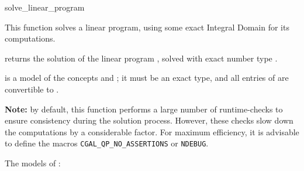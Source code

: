 \begin{ccRefFunction}{solve_linear_program}


This function solves a linear program, using some exact
Integral Domain  for its computations.   

{returns the solution of the linear program , solved
with exact number type .}

 is a model of the concepts  and
; it must
be an exact type, and all entries of  are convertible to 
.

{\bf Note:} by default, this function performs a large number of 
runtime-checks to ensure consistency during the solution process.
However, these checks slow down the computations by a considerable
factor. For maximum efficiency, it is advisable to define the macros
\texttt{CGAL\_QP\_NO\_ASSERTIONS} or \texttt{NDEBUG}.

\ccSeeAlso

The  models of :

\\
\\
\\
\end{ccRefFunction}
